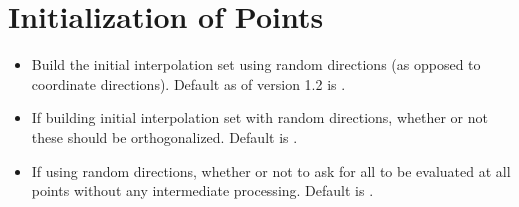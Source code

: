 \documentclass[letterpaper,10pt,english]{sphinxmanual}
\begin{document}
\section{Initialization of Points}
\label{\detokenize{advanced:initialization-of-points}}\begin{itemize}
\item {} 
 \sphinxhyphen{} Build the initial interpolation set using random directions (as opposed to coordinate directions). Default as of version 1.2 is .

\item {} 
 \sphinxhyphen{} If building initial interpolation set with random directions, whether or not these should be orthogonalized. Default is .

\item {} 
 \sphinxhyphen{} If using random directions, whether or not to ask for all  to be evaluated at all points without any intermediate processing. Default is .

\end{itemize}
\end{document}
